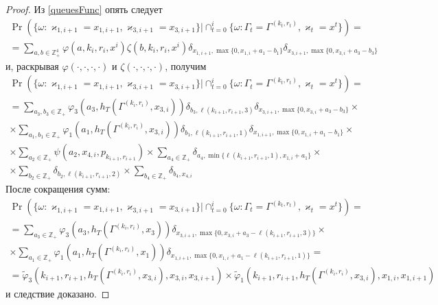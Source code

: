 \documentclass[a4paper,12pt,russian]{extarticle}
\begin{document}
\begin{proof}
Из \eqref{queuesFunc} опять следует
\begin{multline*}
\Pr (\{ \omega \colon \varkappa_{1,i+1} = x_{1,i+1}, \varkappa_{3,i+1} = x_{3,i+1}\} |\cap_{t=0}^{i}\{\omega\colon \Gamma_t=\Gamma^{(k_t,r_t)}, \varkappa_t=x^t\})=\\
= \sum_{a,b\in \mathbb{Z}_+^4} \varphi(a,k_i,r_i,x^i)\zeta(b,k_i,r_i,x^i)  \delta_{x_{1,i+1},\max\{0,x_{1,i}+a_1-b_1\}}   \delta_{x_{3,i+1},\max\{0,x_{3,i}+a_3-b_3\}}
\end{multline*}
и, раскрывая $\varphi(\cdot, \cdot, \cdot, \cdot)$ и $\zeta(\cdot, \cdot, \cdot, \cdot)$, получим
\begin{multline*}
\Pr (\{ \omega \colon \varkappa_{1,i+1} = x_{1,i+1}, \varkappa_{3,i+1} = x_{3,i+1}\} |\cap_{t=0}^{i}\{\omega\colon \Gamma_t=\Gamma^{(k_t,r_t)}, \varkappa_t=x^t\})=\\= \sum_{a_3,b_3\in \mathbb{Z}_+} \varphi_3(a_3,h_T(\Gamma^{(k_i,r_i)},x_{3,i})) \delta_{b_3,\ell(k_{i+1},r_{i+1},3)} \delta_{x_{3,i+1},\max\{0,x_{3,i}+a_3-b_3\}} \times \\
\times \sum_{a_1,b_1\in \mathbb{Z}_+}  \varphi_1(a_1,h_T(\Gamma^{(k_i,r_i)},x_{3,i}))  \delta_{b_1,\ell(k_{i+1},r_{i+1},1)}  \delta_{x_{1,i+1},\max\{0,x_{1,i}+a_1-b_1\}}   \times\\
\times
\sum_{a_2\in \mathbb{Z}_+} \psi(a_2,x_{4,i}, p_{k_{i+1},r_{i+1}}) 
\times  \sum_{a_4\in \mathbb{Z}_+} \delta_{a_4,\min{\{\ell(k_{i+1},r_{i+1},1), x_{1,i}+a_1}\}} \times \\ \times   
\sum_{b_2\in \mathbb{Z}_+}  \delta_{b_2,\ell(k_{i+1},r_{i+1},2)} \times \sum_{b_4\in \mathbb{Z}_+}\delta_{b_4,x_{4,i}} \end{multline*}
После сокращения сумм:
\begin{multline*}
\Pr (\{ \omega \colon \varkappa_{1,i+1} = x_{1,i+1}, \varkappa_{3,i+1} = x_{3,i+1}\} |\cap_{t=0}^{i}\{\omega\colon \Gamma_t=\Gamma^{(k_t,r_t)}, \varkappa_t=x^t\}) = \\
=\sum_{a_3\in \mathbb{Z}_+} \varphi_3(a_3,h_T(\Gamma^{(k_i,r_i)},x_3))  \delta_{x_{3,i+1},\max\{0,x_{3,i}+a_3-\ell(k_{i+1},r_{i+1},3)\}}  \times \\
\times \sum_{a_1\in \mathbb{Z}_+} \varphi_1(a_1,h_T(\Gamma^{(k_i,r_i)},x_1))  \delta_{x_{1,i+1},\max\{0,x_{1,i}+a_1-\ell(k_{i+1},r_{i+1},1)\}} =
\\ =\widetilde{\varphi}_3(k_{i+1},r_{i+1},h_T(\Gamma^{(k_i,r_i)},x_{3,i}),x_{3,i},x_{3,i+1}) \times \widetilde{\varphi}_1(k_{i+1},r_{i+1},h_T(\Gamma^{(k_i,r_i)},x_{3,i}),x_{1,i},x_{1,i+1})
\end{multline*}
и следствие доказано.
\end{proof}
\end{document}
